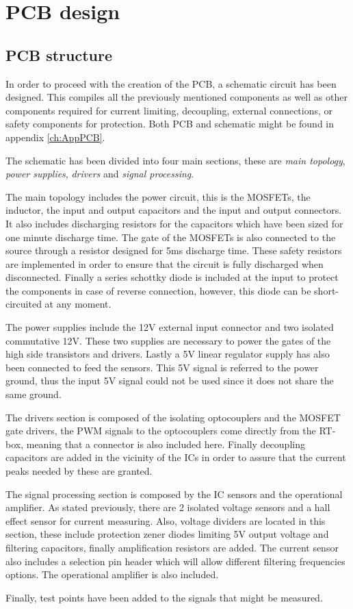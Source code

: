 \section{PCB design}
\subsection{PCB structure} \label{PCB_Schematic}
In order to proceed with the creation of the PCB, a schematic circuit has been designed. This compiles all the previously mentioned components as well as other components required for current limiting, decoupling, external connections, or safety components for protection. Both PCB and schematic might be found in appendix \ref{ch:AppPCB}.

The schematic has been divided into four main sections, these are \textit{main topology}, \textit{power supplies}, \textit{drivers} and \textit{signal processing}.

The main topology includes the power circuit, this is the MOSFETs, the inductor, the input and output capacitors and the input and output connectors. It also includes discharging resistors for the capacitors which have been sized for one minute discharge time. The gate of the MOSFETs is also connected to the source through a resistor designed for 5ms discharge time. These safety resistors are implemented in order to ensure that the circuit is fully discharged when disconnected. Finally a series schottky diode is included at the input to protect the components in case of reverse connection, however, this diode can be short-circuited at any moment.

The power supplies include the 12V external input connector and two isolated commutative 12V. These two supplies are necessary to power the gates of the high side transistors and drivers. Lastly a 5V linear regulator supply has also been connected to feed the sensors. This 5V signal is referred to the power ground, thus the input 5V signal could not be used since it does not share the same ground.

The drivers section is composed of the isolating optocouplers and the MOSFET gate drivers, the PWM signals to the optocouplers come directly from the RT-box, meaning that a connector is also included here. Finally decoupling capacitors are added in the vicinity of the ICs in order to assure that the current peaks needed by these are granted.

The signal processing section is composed by the IC sensors and the operational amplifier. As stated previously, there are 2 isolated voltage sensors and a hall effect sensor for current measuring. Also, voltage dividers are located in this section, these include protection zener diodes limiting 5V output voltage and filtering capacitors, finally amplification resistors are added. The current sensor also includes a selection pin header which will allow different filtering frequencies options. The operational amplifier is also included.

Finally, test points have been added to the signals that might be measured.
